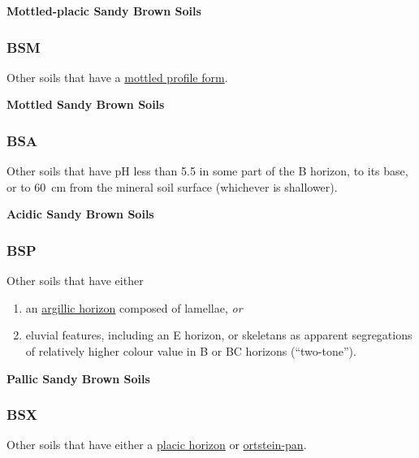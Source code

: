 \documentclass[
  letterpaper,
  DIV=11,
  numbers=noendperiod]{scrreprt}
\providecommand{\tightlist}{%
  \setlength{\itemsep}{0pt}\setlength{\parskip}{0pt}}\usepackage{longtable,booktabs,array}
\begin{document}
\textbf{Mottled-placic Sandy Brown Soils}

\hypertarget{sec-key-BSM}{%
\subsubsection{\texorpdfstring{\textbf{BSM}}{BSM}}\label{sec-key-BSM}}

Other soils that have a \protect\hyperlink{sec-diag-mottpf}{mottled
profile form}.

\textbf{Mottled Sandy Brown Soils}

\hypertarget{sec-key-BSA}{%
\subsubsection{\texorpdfstring{\textbf{BSA}}{BSA}}\label{sec-key-BSA}}

Other soils that have pH less than 5.5 in some part of the B horizon, to
its base, or to 60~cm from the mineral soil surface (whichever is
shallower).

\textbf{Acidic Sandy Brown Soils}

\hypertarget{sec-key-BSP}{%
\subsubsection{\texorpdfstring{\textbf{BSP}}{BSP}}\label{sec-key-BSP}}

Other soils that have either

\begin{enumerate}
\def\labelenumi{\arabic{enumi}.}
\tightlist
\item
  an \protect\hyperlink{sec-diag-argh}{argillic horizon} composed of
  lamellae, \emph{or}
\item
  eluvial features, including an E horizon, or skeletans as apparent
  segregations of relatively higher colour value in B or BC horizons
  (``two-tone'').
\end{enumerate}

\textbf{Pallic Sandy Brown Soils}

\hypertarget{sec-key-BSX}{%
\subsubsection{\texorpdfstring{\textbf{BSX}}{BSX}}\label{sec-key-BSX}}

Other soils that have either a \protect\hyperlink{sec-diag-plac}{placic
horizon} or \protect\hyperlink{sec-diag-opan}{ortstein-pan}.
\end{document}
